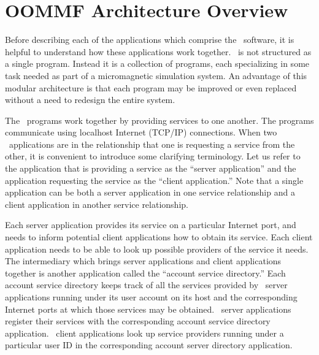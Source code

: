 
\section{OOMMF Architecture Overview}\label{sec:arch}

Before describing each of the applications which comprise
the \OOMMF\ software, it is helpful to understand how these
applications work together.  \OOMMF\ is not structured as
a single program.  Instead it is a collection of programs,
each specializing in some task needed as part of a
micromagnetic simulation system.  An advantage of this modular
architecture is that each program may be improved or even replaced 
without a need to redesign the entire system.

The \OOMMF\  programs work together by providing services
to one another.  
The programs communicate using localhost Internet
(TCP/IP) connections.
When two \OOMMF\ applications are in
the relationship that one is requesting a service from the other,
it is convenient to introduce some clarifying terminology.  Let
us refer to the application that is providing a service as
the ``server application'' and the application requesting the
service as the ``client application.''  
Note that a single application
can be both a server application in one service relationship and a 
client application in another service relationship.  

Each server application provides its service on a particular
Internet port, and needs to inform potential client applications 
how to obtain its service.  Each client application needs to be able
to look up possible providers of the service it needs.  The
intermediary which brings server applications and client applications
together is another application called the 
``account service directory.''
Each account service directory keeps track of all the services provided
by \OOMMF\ server applications running under its user account on its
host and the corresponding Internet ports at which those services
may be obtained.
\OOMMF\ server applications register their services with
the corresponding account service directory application.  \OOMMF\
client applications look up service providers running under a 
particular user ID in the corresponding account server directory 
application.  

